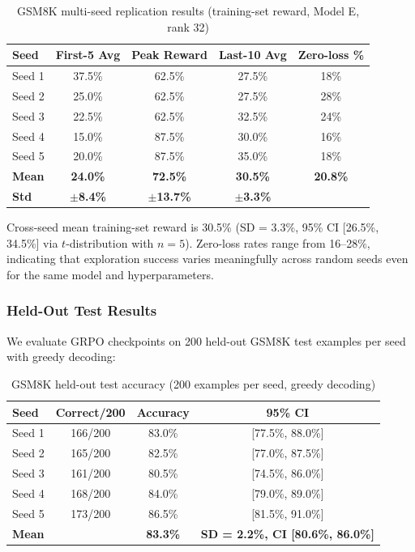 \documentclass{article}
\begin{document}
\begin{table}[htbp]
    \centering
    \caption{GSM8K multi-seed replication results (training-set reward, Model E, rank 32)}
    \begin{tabular}{lcccc}
        \toprule
        Seed & First-5 Avg & Peak Reward & Last-10 Avg & Zero-loss \% \\
        \midrule
        Seed 1  & 37.5\% & 62.5\% & 27.5\% & 18\% \\
        Seed 2 & 25.0\% & 62.5\% & 27.5\% & 28\% \\
        Seed 3 & 22.5\% & 62.5\% & 32.5\% & 24\% \\
        Seed 4 & 15.0\% & 87.5\% & 30.0\% & 16\% \\
        Seed 5 & 20.0\% & 87.5\% & 35.0\% & 18\% \\
        \midrule
        \textbf{Mean} & \textbf{24.0\%} & \textbf{72.5\%} & \textbf{30.5\%} & \textbf{20.8\%} \\
        \textbf{Std} & \textbf{$\pm$8.4\%} & \textbf{$\pm$13.7\%} & \textbf{$\pm$3.3\%} & \\
        \bottomrule
    \end{tabular}
    \label{tab:multiseed}
\end{table}

Cross-seed mean training-set reward is 30.5\% (SD = 3.3\%, 95\% CI [26.5\%, 34.5\%] via $t$-distribution with $n=5$). Zero-loss rates range from 16--28\%, indicating that exploration success varies meaningfully across random seeds even for the same model and hyperparameters.

\subsubsection{Held-Out Test Results}

We evaluate GRPO checkpoints on 200 held-out GSM8K test examples per seed with greedy decoding:

\begin{table}[htbp]
    \centering
    \caption{GSM8K held-out test accuracy (200 examples per seed, greedy decoding)}
    \begin{tabular}{lccc}
        \toprule
        Seed & Correct/200 & Accuracy & 95\% CI \\
        \midrule
        Seed 1  & 166/200 & 83.0\% & [77.5\%, 88.0\%] \\
        Seed 2 & 165/200 & 82.5\% & [77.0\%, 87.5\%] \\
        Seed 3 & 161/200 & 80.5\% & [74.5\%, 86.0\%] \\
        Seed 4 & 168/200 & 84.0\% & [79.0\%, 89.0\%] \\
        Seed 5 & 173/200 & 86.5\% & [81.5\%, 91.0\%] \\
        \midrule
        \textbf{Mean} & & \textbf{83.3\%} & \textbf{SD = 2.2\%, CI [80.6\%, 86.0\%]} \\
        \bottomrule
    \end{tabular}
    \label{tab:heldout}
\end{table}
\end{document}
